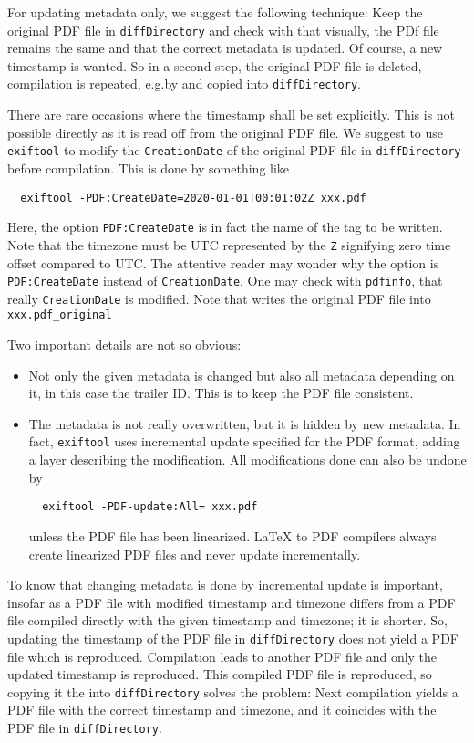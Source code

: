 For updating metadata only, we suggest the following technique: 
Keep the original PDF file in \texttt{diffDirectory} 
and check with  that visually, the PDf file remains the same 
and that the correct metadata is updated. 
Of course, a new timestamp is wanted. 
So in a second step, the original PDF file is deleted, 
compilation is repeated, e.g.\@ by  and copied into \texttt{diffDirectory}. 
\medskip


There are rare occasions where the timestamp shall be set explicitly. 
This is not possible directly as it is read off from the original PDF file. 
We suggest to use \texttt{exiftool} to modify the \texttt{CreationDate} 
of the original PDF file in \texttt{diffDirectory} before compilation. 
This is done by something like
%
\begin{verbatim}
  exiftool -PDF:CreateDate=2020-01-01T00:01:02Z xxx.pdf 
\end{verbatim}
%
Here, the option \texttt{PDF:CreateDate} is in fact the name of the tag to be written. 
Note that the timezone must be UTC represented by the \texttt Z 
signifying zero time offset compared to UTC\@. 
The attentive reader may wonder why the option is \texttt{PDF:CreateDate} instead of \texttt{CreationDate}. 
One may check with \texttt{pdfinfo}, that really \texttt{CreationDate} is modified. 
Note that  writes the original PDF file into \texttt{xxx.pdf\_original}

Two important details are not so obvious: 
%
\begin{itemize}
\item
Not only the given metadata is changed but also all metadata depending on it, 
in this case the trailer ID\@. 
This is to keep the PDF file consistent. 
\item 
The metadata is not really overwritten, but it is hidden by new metadata. 
In fact, \texttt{exiftool} uses incremental update specified for the PDF format, 
adding a layer describing the modification. 
All modifications done can also be undone by 
%
\begin{verbatim}
  exiftool -PDF-update:All= xxx.pdf
\end{verbatim}
%
unless the PDF file has been linearized. 
\LaTeX{} to PDF compilers always create linearized PDF files and never update incrementally. 
\end{itemize}


To know that changing metadata is done by incremental update is important, 
insofar as a PDF file with modified timestamp and timezone  
differs from a PDF file compiled directly with the given timestamp and timezone; 
it is shorter. 
So, updating the timestamp of the PDF file in \texttt{diffDirectory} 
does not yield a PDF file which is reproduced. 
Compilation leads to another PDF file and only the updated timestamp is reproduced. 
This compiled PDF file is reproduced, so 
copying it the into \texttt{diffDirectory} solves the problem: 
Next compilation yields a PDF file with the correct timestamp and timezone, 
and it coincides with the PDF file in \texttt{diffDirectory}. 

